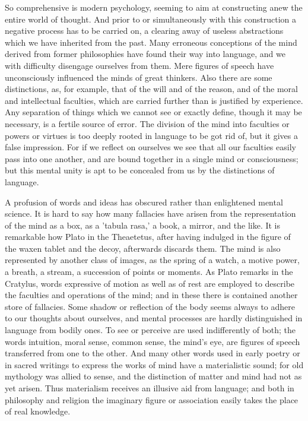 \documentclass[11pt,letter]{article}
\begin{document}
\par  So comprehensive is modern psychology, seeming to aim at constructing anew the entire world of thought. And prior to or simultaneously with this construction a negative process has to be carried on, a clearing away of useless abstractions which we have inherited from the past. Many erroneous conceptions of the mind derived from former philosophies have found their way into language, and we with difficulty disengage ourselves from them. Mere figures of speech have unconsciously influenced the minds of great thinkers. Also there are some distinctions, as, for example, that of the will and of the reason, and of the moral and intellectual faculties, which are carried further than is justified by experience. Any separation of things which we cannot see or exactly define, though it may be necessary, is a fertile source of error. The division of the mind into faculties or powers or virtues is too deeply rooted in language to be got rid of, but it gives a false impression. For if we reflect on ourselves we see that all our faculties easily pass into one another, and are bound together in a single mind or consciousness; but this mental unity is apt to be concealed from us by the distinctions of language.

\par  A profusion of words and ideas has obscured rather than enlightened mental science. It is hard to say how many fallacies have arisen from the representation of the mind as a box, as a 'tabula rasa,' a book, a mirror, and the like. It is remarkable how Plato in the Theaetetus, after having indulged in the figure of the waxen tablet and the decoy, afterwards discards them. The mind is also represented by another class of images, as the spring of a watch, a motive power, a breath, a stream, a succession of points or moments. As Plato remarks in the Cratylus, words expressive of motion as well as of rest are employed to describe the faculties and operations of the mind; and in these there is contained another store of fallacies. Some shadow or reflection of the body seems always to adhere to our thoughts about ourselves, and mental processes are hardly distinguished in language from bodily ones. To see or perceive are used indifferently of both; the words intuition, moral sense, common sense, the mind's eye, are figures of speech transferred from one to the other. And many other words used in early poetry or in sacred writings to express the works of mind have a materialistic sound; for old mythology was allied to sense, and the distinction of matter and mind had not as yet arisen. Thus materialism receives an illusive aid from language; and both in philosophy and religion the imaginary figure or association easily takes the place of real knowledge.
\end{document}
